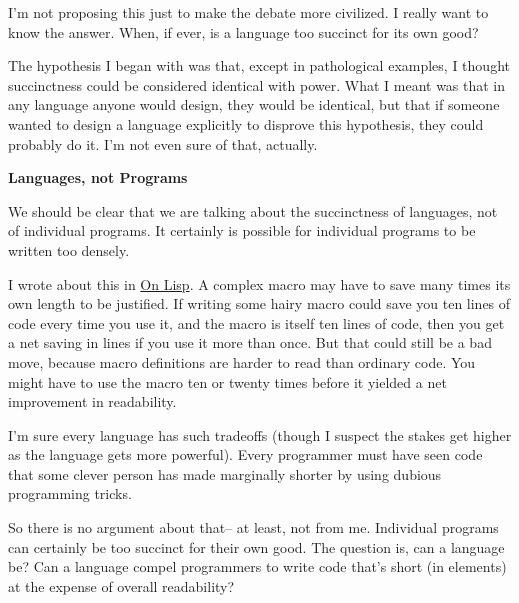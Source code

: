 I'm not proposing this just to make the
                  debate more civilized. I really want to know the answer. When,
                  if ever, is a language too succinct for its own good?

The
                  hypothesis I began with was that, except in pathological
                  examples, I thought succinctness could be considered identical
                  with power. What I meant was that in any language anyone would
                  design, they would be identical, but that if someone wanted to
                  design a language explicitly to disprove this hypothesis, they
                  could probably do it. I'm not even sure of that, actually.

\textbf{Languages, not Programs}

We should be clear that we are talking about the
                  succinctness of languages, not of individual programs. It
                  certainly is possible for individual programs to be written
                  too densely.

I wrote about this in
                  \href{http://www.paulgraham.com/onlisp.html}{On Lisp}. A complex macro may have to
                  save many times its own length to be justified. If writing
                  some hairy macro could save you ten lines of code every time
                  you use it, and the macro is itself ten lines of code, then
                  you get a net saving in lines if you use it more than once.
                  But that could still be a bad move, because macro definitions
                  are harder to read than ordinary code. You might have to use
                  the macro ten or twenty times before it yielded a net
                  improvement in readability.

I'm sure every language
                  has such tradeoffs (though I suspect the stakes get higher as
                  the language gets more powerful). Every programmer must have
                  seen code that some clever person has made marginally shorter
                  by using dubious programming tricks.

So there is no
                  argument about that-- at least, not from me. Individual
                  programs can certainly be too succinct for their own good. The
                  question is, can a language be? Can a language compel
                  programmers to write code that's short (in elements) at the
                  expense of overall readability?

